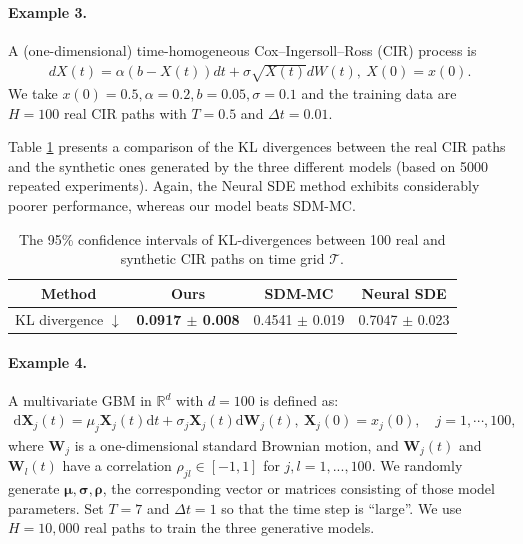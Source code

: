 \documentclass[11pt]{article}
\newcommand{\tbf}{\textbf}
\newcommand{\mR}{\mathbb{R}}
\newcommand{\bX}{\mathbf{X}}
\newcommand{\bW}{\mathbf{W}}
\newcommand{\intd}{\mathrm{d}}
\begin{document}
\vspace{-10mm}
\paragraph{Example 3.}
A (one-dimensional) time-homogeneous Cox–Ingersoll–Ross (CIR) process is
\begin{align*}%
    dX(t) = \alpha(b - X(t))dt + \sigma\sqrt{X(t)}dW(t),\ X(0) = x(0).
\end{align*}
We take $x(0) = 0.5, \alpha = 0.2, b = 0.05, \sigma=0.1$ and the training data are $H=100$ real CIR paths with $T=0.5$ and $\Delta t= 0.01$.


Table \ref{table: CIR_KL} presents a comparison of the KL divergences between the real CIR paths and the synthetic ones generated by the three different models (based on 5000 repeated experiments). Again, the Neural SDE method exhibits considerably poorer performance, whereas our model beats SDM-MC.

\begin{table}[htp]
    \centering
    \begin{tabular}{c | c c c}
    \toprule
     Method & Ours & SDM-MC & Neural SDE\\
     \midrule
     KL divergence $\downarrow$ & \tbf{0.0917 $\pm$ 0.008} & 0.4541 $\pm$ 0.019 & 0.7047 $\pm$ 0.023\\
    \bottomrule
    \end{tabular}
    \caption{The 95\% confidence intervals of KL-divergences between  100 real and synthetic CIR paths on time grid $\mathcal{T}$.}
    \label{table: CIR_KL}
\end{table}


\vspace{-5mm}
\paragraph{Example 4.}
A multivariate GBM in $\mR^{d}$ with $d=100$ is defined as:
\begin{align*}%
	\intd\bX_j(t) = \mu_j\bX_j(t)\intd t + \sigma_j\bX_j(t) \intd\bW_j(t),\ \bX_j(0) = x_j(0),\quad j=1,\cdots, 100,
\end{align*}
where $\bW_j$ is a one-dimensional standard Brownian motion, and $\bW_j(t)$ and $\bW_l(t)$ have a correlation $\rho_{jl}\in[-1, 1]$ for $j, l=1,..., 100$. We randomly generate $\boldsymbol{\mu}, \boldsymbol{\sigma}, \boldsymbol{\rho}$, the corresponding vector or matrices consisting of those model parameters.
Set $T=7$ and $\Delta t=1$ so that the time step is ``large''. We use $H=10,000$ real paths to train the three generative models.
\end{document}
